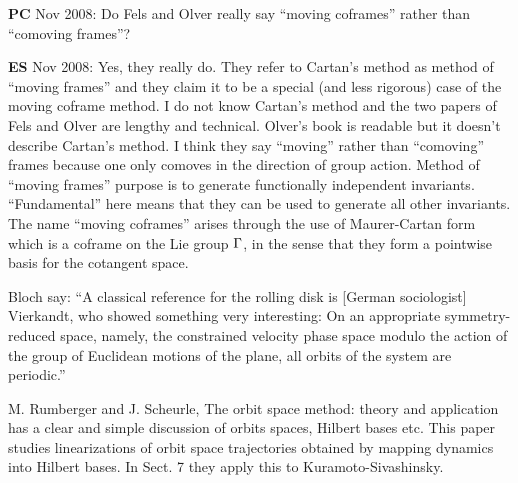 {{\bf PC} Nov 2008:
Do Fels and Olver really say
``moving coframes'' rather than ``comoving frames''?

{\bf ES}  Nov 2008: Yes, they really do. They refer to
Cartan's method as method of ``moving frames'' and they claim
it to be a special (and less rigorous) case of the moving
coframe method. I do not know Cartan's method and the two
papers of Fels and Olver are
lengthy and technical. Olver's book is readable but it
doesn't describe Cartan's method. I think they say ``moving''
rather than ``comoving'' frames because one only comoves in
the direction of group action.
Method of ``moving frames'' purpose is to generate
functionally independent invariants. ``Fundamental'' here means that they can be
used to generate all other invariants.
The name ``moving coframes'' arises through the use of
Maurer-Cartan form which is a coframe on the Lie group
$\Gamma$, in the sense that they form a pointwise basis for
the cotangent space.

     {Bloch \etal} say:
``A classical reference for the rolling disk is [German
sociologist]
{Vierkandt}, who showed
something very interesting: On an appropriate
symmetry-reduced space, namely, the constrained velocity
phase space modulo the action of the group of Euclidean
motions of the plane, all orbits of the system are
periodic.''

M. Rumberger and J. Scheurle,
     {The orbit space method: theory and application}
has a clear and simple discussion of orbits spaces,
Hilbert bases etc. This paper studies linearizations of orbit space
trajectories obtained by mapping dynamics into Hilbert bases.
In Sect. 7 they apply this to Kuramoto-Sivashinsky.

    } %

